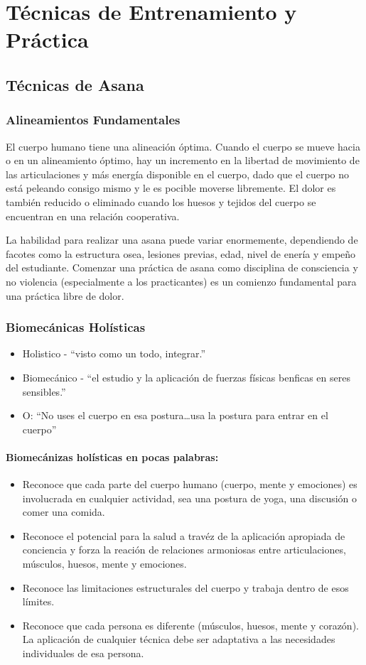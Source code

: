 \chapter{Técnicas de Entrenamiento y Práctica}
\section{Técnicas de Asana}
\subsection{Alineamientos Fundamentales}
El cuerpo humano tiene una alineación óptima. Cuando el cuerpo se mueve hacia o en un alineamiento óptimo, hay un incremento en la libertad de movimiento de las articulaciones y más energía disponible en el cuerpo, dado que el cuerpo no está peleando consigo mismo y le es pocible moverse libremente. El dolor es tambi\'en reducido o eliminado cuando los huesos y tejidos del cuerpo se encuentran en una relación cooperativa.

La habilidad para realizar una asana puede variar enormemente, dependiendo de facotes como la estructura osea, lesiones previas, edad, nivel de enería y empeño del estudiante. Comenzar una práctica de asana como disciplina de consciencia y no violencia (especialmente a los practicantes) es un comienzo fundamental para una práctica libre de dolor.


\subsection{Biomecánicas Holísticas}
\begin{itemize}
	\item Holistico - ``visto como un todo, integrar.''
	\item Biomecánico - ``el estudio y la aplicación de fuerzas físicas benficas en seres sensibles.''
	\item O: ``No uses el cuerpo en esa postura\ldots usa la postura para entrar en el cuerpo''
\end{itemize}

\subsubsection{Biomecánizas holísticas en pocas palabras:}
\begin{itemize}
	\item Reconoce que cada parte del cuerpo humano (cuerpo, mente y emociones) es involucrada en cualquier actividad, sea una postura de yoga, una discusión o comer una comida.
	\item Reconoce el potencial para la salud a trav\'ez de la aplicación apropiada de conciencia y forza la reación de relaciones armoniosas entre articulaciones, músculos, huesos, mente y emociones.
	\item Reconoce las limitaciones estructurales del cuerpo y trabaja dentro de esos límites.
	\item Reconoce que cada persona es diferente (músculos, huesos, mente y corazón). La aplicación de cualquier t\'ecnica debe ser adaptativa a las necesidades individuales de esa persona.
\end{itemize}

